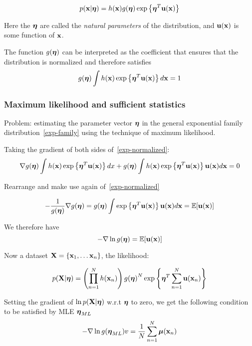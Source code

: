 \begin{equation}
    p(\mathbf{x}|\boldsymbol\eta) = h(\mathbf{x}) g(\boldsymbol\eta) \exp\left\{ \boldsymbol\eta^T \mathbf{u}(\mathbf{x})
\right\}
\label{exp-family}
\end{equation}

Here the $\boldsymbol\eta$ are called the \emph{natural parameters} of the
distribution, and $\mathbf{u}(\mathbf{x})$ is some function of $\mathbf{x}$. 

The function $g(\boldsymbol\eta)$ can be interpreted as the coefficient that
ensures that the distribution is normalized and therefore satisfies
\begin{equation} 
    g(\boldsymbol\eta) \int h(\mathbf{x}) \exp\left\{ \boldsymbol\eta^T \mathbf{u}(\mathbf{x}) \right\}d\mathbf{x}
= 1
\label{exp-normalized}
\end{equation}

\subsubsection{Maximum likelihood and sufficient statistics}
Problem: estimating the parameter vector $\boldsymbol\eta$ in the general
exponential family distribution~\ref{exp-family} using the technique of
maximum likelihood.

Taking the gradient of both sides of~\ref{exp-normalized}:
\begin{equation}
    \nabla g(\boldsymbol\eta) \int h(\mathbf{x}) \exp\left\{ \boldsymbol\eta^T \mathbf{u}(\mathbf{x}) \right\} dx
    + g(\boldsymbol\eta) \int h(\mathbf{x}) \exp\left\{ \boldsymbol\eta^T \mathbf{u}(\mathbf{x}) \right\}\mathbf{u}(\mathbf{x})
    d\mathbf{x} = 0
\end{equation}

Rearrange and make use again of~\ref{exp-normalized}

\begin{equation}
    -\frac{1}{g(\boldsymbol\eta)} \nabla g(\boldsymbol\eta) = g(\boldsymbol\eta)\int \exp\left\{
    \boldsymbol\eta^T \mathbf{u}(\mathbf{x}) \right\}\mathbf{u}(\mathbf{x})d\mathbf{x} = \mathbb{E}[\mathbf{u}(\mathbf{x})]
\end{equation}

We therefore have 
\begin{equation}
    -\nabla\ln{g(\boldsymbol\eta)} = \mathbb{E}[\mathbf{u}(\mathbf{x})]
\end{equation}

Now a dataset $\mathbf{X} = \{\mathbf{x}_1, \dots \mathbf{x}_n\}$, the likelihood:

\begin{equation}
    p(\mathbf{X}|\boldsymbol\eta) = \left( \prod_{n=1}^N h(\mathbf{x}_n) \right) {g(\boldsymbol\eta)}^N
    \exp\left\{ \boldsymbol\eta^T \sum_{n=1}^N \mathbf{u}(\mathbf{x}_n) \right\}
\end{equation}

Setting the gradient of $\ln p(\mathbf{X}|\boldsymbol\eta)$ w.r.t $\boldsymbol\eta$ to zero, we get
the following condition to be satisfied by MLE $\boldsymbol\eta_{ML}$
\begin{equation}
    -\nabla \ln{g(\boldsymbol\eta_{ML})} v= \frac{1}{N} \sum_{n=1}^N \boldsymbol\mu
    (\mathbf{x}_{n})
\end{equation}

